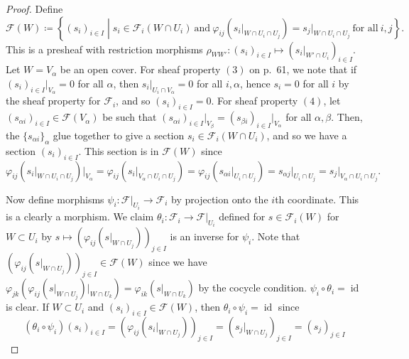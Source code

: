 \documentclass[12pt,letterpaper]{article}
\theoremstyle{definition}
\theoremstyle{remark}
\numberwithin{equation}{section}
\numberwithin{figure}{problem}
\begin{document}
\begin{proof}
  Define
  \begin{equation*}
    \mathscr{F}(W) \coloneqq \left\{ (s_i)_{i \in I} \middle\vert s_i \in \mathscr{F}_i(W \cap U_i)~\text{and}~\varphi_{ij}(s_i\vert_{W \cap U_i \cap U_j}) = s_j\vert_{W \cap U_i \cap U_j}~\text{for all}~i,j\right\}.
  \end{equation*}
  This is a presheaf with restriction morphisms $\rho_{WW'}\colon (s_i)_{i \in I} \mapsto (s_i\vert_{W' \cap U_i})_{i \in I}$. Let $W = V_\alpha$ be an open cover. For sheaf property $(3)$ on p.~61, we note that if $(s_i)_{i \in I}\vert_{V_\alpha} = 0$ for all $\alpha$, then $s_i\vert_{U_i \cap V_\alpha} = 0$ for all $i,\alpha$, hence $s_i = 0$ for all $i$ by the sheaf property for $\mathscr{F}_i$, and so $(s_i)_{i \in I} = 0$. For sheaf property $(4)$, let $(s_{\alpha i})_{i \in I} \in \mathscr{F}(V_\alpha)$ be such that $(s_{\alpha i})_{i \in I}\vert_{V_\beta} = (s_{\beta i})_{i \in I}\vert_{V_\alpha}$ for all $\alpha,\beta$. Then, the $\{s_{\alpha i}\}_\alpha$ glue together to give a section $s_i \in \mathscr{F}_i(W \cap U_i)$, and so we have a section $(s_i)_{i \in I}$. This section is in $\mathscr{F}(W)$ since
  \begin{equation*}
    \varphi_{ij}(s_i\vert_{W \cap U_i \cap U_j})\vert_{V_\alpha} = \varphi_{ij}(s_i\vert_{V_\alpha \cap U_i \cap U_j}) = \varphi_{ij}(s_{\alpha i}\vert_{U_i \cap U_j}) = s_{\alpha j}\vert_{U_i \cap U_j} = s_j\vert_{V_\alpha \cap U_i \cap U_j}.
  \end{equation*}
  \par Now define morphisms $\psi_i\colon\mathscr{F}\vert_{U_i} \to \mathscr{F}_i$ by projection onto the $i$th coordinate. This is a clearly a morphism. We claim $\theta_i\colon \mathscr{F}_i \to \mathscr{F}\vert_{U_i}$ defined for $s \in \mathscr{F}_i(W)$ for $W \subset U_i$ by $s \mapsto (\varphi_{ij}(s\vert_{W \cap U_j}))_{j \in I}$ is an inverse for $\psi_i$. Note that $(\varphi_{ij}(s\vert_{W \cap U_j}))_{j \in I}\in \mathscr{F}(W)$ since we have $\varphi_{jk}(\varphi_{ij}(s\vert_{W \cap U_j})\vert_{W \cap U_k}) = \varphi_{ik}(s\vert_{W \cap U_k})$ by the cocycle condition. $\psi_i \circ \theta_i = \operatorname{id}$ is clear. If $W \subset U_i$ and $(s_i)_{i \in I} \in \mathscr{F}(W)$, then $\theta_i \circ \psi_i = \operatorname{id}$ since
  \begin{equation*}
    (\theta_i \circ \psi_i)(s_i)_{i \in I} = (\varphi_{ij}(s_i\vert_{W \cap U_j}))_{j \in I} = (s_j\vert_{W \cap U_j})_{j \in I} = (s_j)_{j \in I}
  \end{equation*}

\end{proof}
\end{document}
